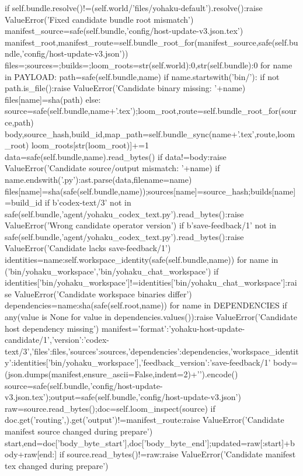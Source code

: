   if self.bundle.resolve()!=(self.world/'files/yohaku-default').resolve():raise ValueError('Fixed candidate bundle root mismatch')
  manifest_source=safe(self.bundle,'config/host-update-v3.json.tex')
  manifest_root,manifest_route=self.bundle_root_for(manifest_source,safe(self.bundle,'config/host-update-v3.json'))
  files={};sources={};builds={};loom_roots={str(self.world):0,str(self.bundle):0}
  for name in PAYLOAD:
   path=safe(self.bundle,name)
   if name.startswith('bin/'):
    if not path.is_file():raise ValueError('Candidate binary missing: '+name)
    files[name]=sha(path)
   else:
    source=safe(self.bundle,name+'.tex');loom_root,route=self.bundle_root_for(source,path)
    body,source_hash,build_id,map_path=self.bundle_sync(name+'.tex',route,loom_root)
    loom_roots[str(loom_root)]+=1
    data=safe(self.bundle,name).read_bytes()
    if data!=body:raise ValueError('Candidate source/output mismatch: '+name)
    if name.endswith('.py'):ast.parse(data,filename=name)
    files[name]=sha(safe(self.bundle,name));sources[name]=source_hash;builds[name]=build_id
  if b'codex-text/3' not in safe(self.bundle,'agent/yohaku_codex_text.py').read_bytes():raise ValueError('Wrong candidate operator version')
  if b'save-feedback/1' not in safe(self.bundle,'agent/yohaku_codex_text.py').read_bytes():raise ValueError('Candidate lacks save-feedback/1')
  identities={name:self.workspace_identity(safe(self.bundle,name)) for name in ('bin/yohaku_workspace','bin/yohaku_chat_workspace')}
  if identities['bin/yohaku_workspace']!=identities['bin/yohaku_chat_workspace']:raise ValueError('Candidate workspace binaries differ')
  dependencies={name:sha(safe(self.root,name)) for name in DEPENDENCIES}
  if any(value is None for value in dependencies.values()):raise ValueError('Candidate host dependency missing')
  manifest={'format':'yohaku-host-update-candidate/1','version':'codex-text/3','files':files,'sources':sources,'dependencies':dependencies,'workspace_identity':identities['bin/yohaku_workspace'],'feedback_version':'save-feedback/1'}
  body=(json.dumps(manifest,ensure_ascii=False,indent=2)+'\n').encode()
  source=safe(self.bundle,'config/host-update-v3.json.tex');output=safe(self.bundle,'config/host-update-v3.json')
  raw=source.read_bytes();doc=self.loom_inspect(source)
  if doc.get('routing',{}).get('output')!=manifest_route:raise ValueError('Candidate manifest source changed during prepare')
  start,end=doc['body_byte_start'],doc['body_byte_end'];updated=raw[:start]+body+raw[end:]
  if source.read_bytes()!=raw:raise ValueError('Candidate manifest tex changed during prepare')
